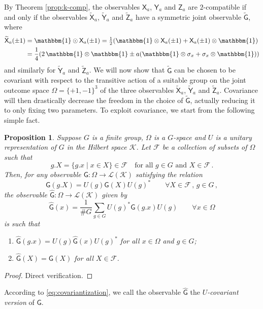 \documentclass[12pt]{amsart}
\newtheorem{proposition}{Proposition}
\theoremstyle{definition}
\newcommand{\half}{\tfrac{1}{2}} %
\newcommand{\ff}{\mathcal{F}}
\newcommand{\kk}{\mathcal{K}} %
\newcommand{\lk}{\mathcal{L(K)}} %
\newcommand{\id}{\mathbbm{1}} %
\newcommand{\G}{\mathsf{G}}%
\newcommand{\X}{\mathsf{X}}%
\newcommand{\Y}{\mathsf{Y}}%
\newcommand{\Z}{\mathsf{Z}}%
\begin{document}
By Theorem \ref{prop:k-comp}, the observables $\X_a$, $\Y_a$ and $\Z_a$ are $2$-compatible if and only if the observables $\widetilde{\X}_a$, $\widetilde{\Y}_a$ and $\widetilde{\Z}_a$ have a symmetric joint observable $\widetilde{\G}$, where
\begin{align}
\widetilde{\X}_a(\pm 1) & = \id\odot\X_a(\pm 1) = \half (\id \otimes \X_a(\pm 1) + \X_a(\pm 1) \otimes \id ) \notag\\
&= \frac{1}{4} ( 2 \, \id \otimes \id \pm a (\id \otimes \sigma_x + \sigma_x\otimes \id ) ) \label{eq:tildeX}
\end{align}
and similarly for $\widetilde{\Y}_a$ and $\widetilde{\Z}_a$. We will now show that $\widetilde{\G}$ can be chosen to be covariant with respect to the transitive action of a suitable group on the joint outcome space $\Omega = \{+1,-1\}^3$ of the three observables $\widetilde{\X}_a$, $\widetilde{\Y}_a$ and $\widetilde{\Z}_a$. Covariance will then drastically decrease the freedom in the choice of $\widetilde{\G}$, actually reducing it to only fixing two parameters.
To exploit covariance, we start from the following simple fact.

\begin{proposition}\label{prop:covariantization}
Suppose $G$ is a finite group, $\Omega$ is a $G$-space and $U$ is a unitary representation of $G$ in the Hilbert space $\kk$. Let $\ff$ be a collection of subsets of $\Omega$ such that
$$
g.X = \{g.x\mid x\in X\}\in\ff \quad \text{for all $g\in G$ and $X\in\ff$} \,.
$$
Then, for any observable $\G:\Omega\to\lk$ satisfying the relation
$$
\G(g.X) = U(g)\G(X)U(g)^* \qquad \forall X\in\ff\,,\,g\in G \,,
$$
the observable $\widehat{\G}:\Omega\to\lk$ given by
\begin{equation}\label{eq:covariantization}
\widehat{\G}(x) = \frac{1}{\# G} \sum_{g\in G} U(g)^*\G(g.x)U(g) \qquad \forall x\in\Omega
\end{equation}
is such that
\begin{enumerate}[leftmargin=*,labelsep=3mm,label=(\roman*)]
\item $\widehat{\G}(g.x) = U(g)\widehat{\G}(x)U(g)^*$ for all $x\in\Omega$ and $g\in G$;
\item $\widehat{\G}(X) = \G(X)$ for all $X\in\ff$.
\end{enumerate}
\end{proposition}
\begin{proof}
Direct verification.
\end{proof}

According to \eqref{eq:covariantization}, we call the observable $\widehat{\G}$ the {\em $U$-covariant version} of $\G$.
\end{document}
